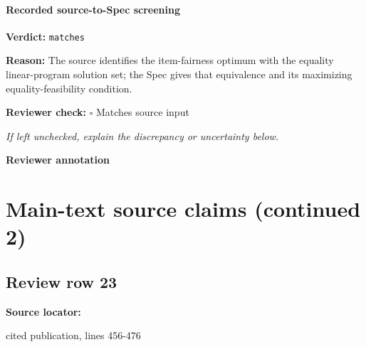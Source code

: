\documentclass[10pt]{article}
\newcommand{\reviewerbox}{%
  \par\noindent\fbox{\parbox{0.96\linewidth}{\rule{0pt}{0.38in}}}\par
}
\newcommand{\reviewmatch}[1]{%
  \par\noindent\textbf{Reviewer check:} $\square$\; #1\par
  \noindent\emph{If left unchecked, explain the discrepancy or uncertainty below.}\par
}
\begin{document}
\paragraph{Recorded source-to-Spec screening}
\textbf{Verdict:} \texttt{matches}
\\
{\raggedright
\textbf{Reason:} The source identifies the item-\allowbreak{}fairness optimum with the equality linear-\allowbreak{}program solution set;\allowbreak{} the Spec gives that equivalence and its maximizing equality-\allowbreak{}feasibility condition.\allowbreak{}
\par}
\reviewmatch{Matches source input}
\noindent\textbf{Reviewer annotation}\par
\reviewerbox
\clearpage
\hypertarget{source-claim-3329ea5a9ac31365}{}
\hypertarget{source-section-62736bb95a656bbc}{}
\section*{Main-text source claims (continued 2)}
\subsection*{Review row 23}
\textbf{Source locator:} {\footnotesize\raggedright cited publication, lines 456-\allowbreak{}476\par}
\end{document}

